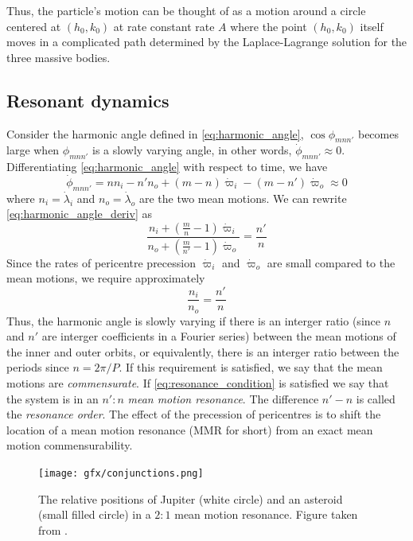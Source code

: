\documentclass[ twoside,openright,titlepage,numbers=noenddot,headinclude,%
                footinclude=true,cleardoublepage=empty,abstractoff, %
                BCOR=5mm,paper=a4,fontsize=11pt,%
                american,%
                ]{scrreprt}
\begin{document}
Thus, the particle's motion can be thought of as a motion around 
a circle centered at $(h_0,k_0)$ at rate constant rate $A$ where
the point $(h_0,k_0)$ itself moves in a complicated path determined
by the Laplace-Lagrange solution for the three massive bodies. 

\subsection{Resonant dynamics}
\label{sub:Resonant_dynamics}
Consider the harmonic angle defined in \cref{eq:harmonic_angle}, 
$\cos\phi_{mnn'}$ becomes large when $\phi_{mnn'}$ is a slowly
varying angle, in other words, $\dot{\phi}_{mnn'}\approx 0$. 
Differentiating \cref{eq:harmonic_angle} with respect to time,
we have
\begin{equation}
    \dot{\phi}_{mnn'}=nn_i-n'n_o+(m-n)\dot{\varpi}_i-(m-n')\dot{
        \varpi}_o\approx 0
    \label{eq:harmonic_angle_deriv}
\end{equation}
where $n_i=\dot{\lambda}_i$ and $n_o=\dot{\lambda}_o$ are the two
mean motions. We can rewrite \cref{eq:harmonic_angle_deriv} as
\begin{equation}
    \frac{n_i+( \frac{m}{n} -1)\dot{\varpi}_i}
    {n_o + ( \frac{m}{n'}-1)\dot{\varpi}_o } 
    = \frac{n'}{n} 
    \label{eq:resonance_condition}
\end{equation}
Since the rates of pericentre precession $\dot{\varpi}_i$ 
and $\dot{\varpi}_o$ are small compared to the mean motions, we
require approximately
\begin{equation}
    \frac{n_i}{n_o} = \frac{n'}{n} 
\end{equation}
Thus, the harmonic angle is slowly varying if there is an interger 
ratio (since $n$ and $n'$ are interger coefficients in a Fourier 
series) between the mean motions of
the inner and outer orbits, or equivalently, there is an interger
ratio between the periods since $n=2\pi/P$. If this 
requirement is satisfied, we say that the mean motions
are \emph{commensurate}. If \cref{eq:resonance_condition} is 
satisfied we say that the system is in an $n':n$ 
\emph{mean motion resonance}.
The difference $n'-n$ is called the \emph{resonance order}.
The effect of the precession of pericentres is to shift the location
of a mean motion resonance (MMR for short) from an exact 
mean motion commensurability.
\begin{figure}[htb]
\centering
    \texttt{[image: gfx/conjunctions.png]}
    \caption{The relative positions of Jupiter (white circle) and 
    an asteroid (small filled circle) in a $2:1$ mean motion
    resonance. Figure taken from \cite{murray}.}
\label{fig:conjuctions}
\end{figure}
\end{document}
